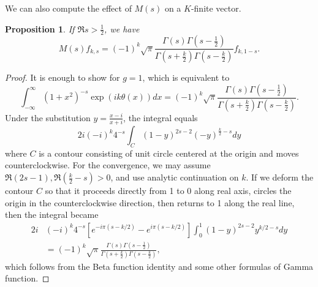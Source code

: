 \documentclass{article}
\newtheorem{proposition}{Proposition}[section]
\begin{document}
We can also compute the effect of $M(s)$ on a $K$-finite vector. 
\begin{proposition}
If $\Re s>\frac{1}{2}$, we have
$$M(s)f_{k, s} = (-1)^{k} \sqrt{\pi} \frac{\Gamma(s)\Gamma\left( s- \frac{1}{2}\right)}{\Gamma\left(s+\frac{k}{2}\right)\Gamma\left(s-\frac{k}{2}\right)} f_{k, 1-s}.$$
\end{proposition}
\begin{proof}
It is enough to show for $g = 1$, which is equivalent to 
$$
\int_{-\infty}^{\infty} (1+x^{2})^{-s}\exp(ik\theta(x)) dx = (-1)^{k} \sqrt{\pi} \frac{\Gamma(s)\Gamma\left( s-\frac{1}{2}\right)}{\Gamma\left(s+\frac{k}{2}\right)\Gamma\left(s-\frac{k}{2}\right)}.
$$
Under the substitution $y = \frac{x-i}{x+i}$, the integral equals
$$
2i(-i)^{k} 4^{-s} \int_{C} (1-y)^{2s-2}(-y)^{\frac{k}{2}-s}dy
$$
where $C$ is a contour consisting of  unit circle centered at the origin and moves counterclockwise. 
For the convergence, we may assume $\Re(2s - 1), \Re(\frac{k}{2}-s) >0$, and use analytic continuation on $k$. 
If we deform the contour $C$ so that it proceeds directly from 1 to 0 along real axis, circles the origin in the counterclockwise direction, then returns to 1 along the real line, then the integral became
\begin{align*}
2i&(-i)^{k}4^{-s}[e^{-i\pi(s-k/2)} - e^{i\pi (s-k/2)}] \int_{0}^{1}(1-y)^{2s-2}y^{k/2-s}dy \\
&=(-1)^{k}\sqrt{\pi} \frac{\Gamma(s)\Gamma\left( s- \frac{1}{2}\right)}{\Gamma\left(s+\frac{k}{2}\right)\Gamma\left(s-\frac{k}{2}\right)},
\end{align*}
which follows from the Beta function identity and some other formulas of Gamma function. 
\end{proof}
\end{document}
